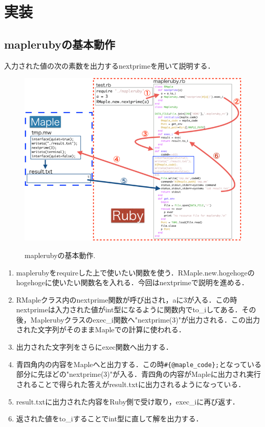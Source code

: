 \section{実装}
\subsection{maplerubyの基本動作}
入力された値の次の素数を出力するnextprimeを用いて説明する．

\begin{figure}[htbp]\begin{center}
\includegraphics[width=12cm,bb= 0 0 937 753]{../figs/./mapleruby_eringi.003.png}
\caption{maplerubyの基本動作.}
\label{figure:one}
\label{default}\end{center}\end{figure}
\begin{enumerate}
\item maplerubyをrequireした上で使いたい関数を使う．RMaple.new.hogehogeのhogehogeに使いたい関数名を入れる．今回はnextprimeで説明を進める．
\item RMapleクラス内のnextprime関数が呼び出され，aに3が入る．この時nextprimeは入力された値がint型になるように関数内でto\_iしてある．その後，Maplerubyクラスのexec\_i関数へ"nextprime(3)"が出力される．この出力された文字列がそのままMapleでの計算に使われる．
\item 出力された文字列をさらにexec関数へ出力する．
\item 青四角内の内容をMapleへと出力する．この時\verb|#{@maple_code};|となっている部分に先ほどの"nextprime(3)"が入る．青四角の内容がMapleに出力され実行されることで得られた答えがresult.txtに出力されるようになっている．
\item result.txtに出力された内容をRuby側で受け取り，exec\_iに再び返す．
\item 返された値をto\_iすることでint型に直して解を出力する．
\end{enumerate}
